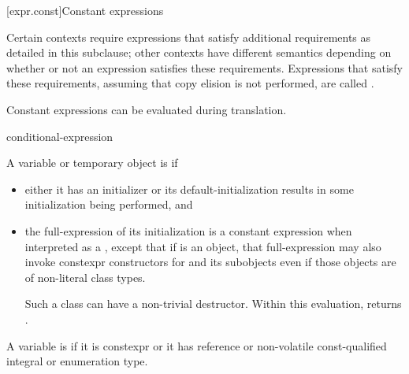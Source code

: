 [expr.const]{Constant expressions}%

\pnum
Certain contexts require expressions that satisfy additional
requirements as detailed in this subclause; other contexts have different
semantics depending on whether or not an expression satisfies these requirements.
Expressions that satisfy these requirements,
assuming that copy elision is not performed,
are called
%
.
\begin{note}
Constant expressions can be evaluated
during translation.
\end{note}

\begin{bnf}
\br
    conditional-expression
\end{bnf}

\pnum
A variable or temporary object  is  if
\begin{itemize}
\item
  either it has an initializer or
  its default-initialization results in some initialization being performed, and
\item
  the full-expression of its initialization is a constant expression
  when interpreted as a ,
  except that if  is an object,
  that full-expression
  may also invoke constexpr constructors
  for  and its subobjects
  even if those objects are of non-literal class types.
  \begin{note}
  Such a class can have a non-trivial destructor.
  Within this evaluation,
  returns .
\end{note}
\end{itemize}

\pnum
A variable is  if
it is constexpr or
it has reference or non-volatile const-qualified integral or enumeration type.

